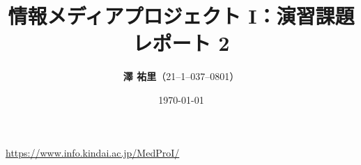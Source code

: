 \documentclass[dvipdfmx]{jsarticle}
\begin{document}
\title{\vspace{10zw}情報メディアプロジェクト I：演習課題レポート 2\\}
\date{\today} %
\author{\Large{\textbf{澤 \/ 祐里}}（21--1--037--0801）} %
 
\thispagestyle{empty}
\maketitle
\thispagestyle{empty}
\clearpage

\setcounter{page}{1}
\setcounter{secnumdepth}{4}
\setcounter{tocdepth}{4}
\hypertarget{mokuji}{\tableofcontents}
\clearpage



\clearpage


\clearpage


\clearpage


\clearpage


\clearpage


\clearpage

\begin{thebibliography}{9}
   \url{https://www.info.kindai.ac.jp/MedProI/}
\end{thebibliography}
\end{document}
